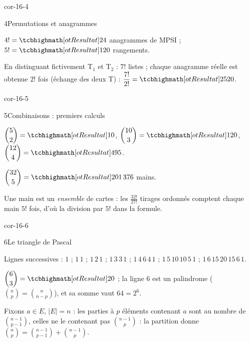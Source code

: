 \begin{blocLivre}{cor-16-4}
\begin{corrige}{4}{Permutations et anagrammes}
\begin{questions}
  \item $4!=\res{24}$ anagrammes de MPSI ; $5!=\res{120}$ rangements.
  \item En distinguant fictivement $\mathrm{T}_1$ et $\mathrm{T}_2$ :
    $7!$ listes ; chaque anagramme réelle est obtenue $2!$ fois (échange
    des deux T) : $\dfrac{7!}{2!}=\res{2520}$.
\end{questions}
\end{corrige}
\end{blocLivre}

\begin{blocLivre}{cor-16-5}
\begin{corrige}{5}{Combinaisons : premiers calculs}
\begin{questions}
  \item $\dbinom52=\res{10}$, $\dbinom{10}3=\res{120}$,
    $\dbinom{12}4=\res{495}$.
  \item $\dbinom{32}5=\res{201\,376}$ mains.
  \item Une main est un \emph{ensemble} de cartes : les
    $\frac{32!}{27!}$ tirages ordonnés comptent chaque main $5!$ fois,
    d'où la division par $5!$ dans la formule.
\end{questions}
\end{corrige}
\end{blocLivre}

\begin{blocLivre}{cor-16-6}
\begin{corrige}{6}{Le triangle de Pascal}
\begin{questions}
  \item Lignes successives :
    $1$ ; $1\,1$ ; $1\,2\,1$ ; $1\,3\,3\,1$ ; $1\,4\,6\,4\,1$ ;
    $1\,5\,10\,10\,5\,1$ ; $1\,6\,15\,20\,15\,6\,1$.
  \item $\dbinom63=\res{20}$ ; la ligne $6$ est un palindrome
    ($\binom np=\binom n{n-p}$), et sa somme vaut $64=2^{6}$.
  \item Fixons $a\in E$, $|E|=n$ : les parties à $p$ éléments contenant
    $a$ sont au nombre de $\binom{n-1}{p-1}$, celles ne le contenant pas
    $\binom{n-1}p$ : la partition donne
    $\binom np=\binom{n-1}{p-1}+\binom{n-1}{p}$.
\end{questions}
\end{corrige}
\end{blocLivre}

